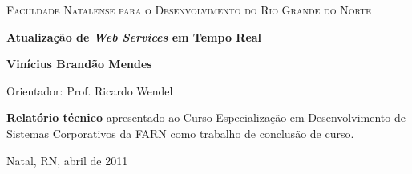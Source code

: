 %
%

\begin{titlepage}

\begin{center}

\small

\begin{center}
\textsf{\textsc{Faculdade Natalense para o Desenvolvimento do Rio Grande do Norte}}
\end{center} %

\vfill

\LARGE

\textbf{Atualização de \textit{Web Services} em Tempo Real}

\vfill

\Large

\textbf{Vinícius Brandão Mendes}

\vfill

\normalsize

Orientador: Prof. Ricardo Wendel

\vfill

\hfill
\parbox{0.5\linewidth}{\textbf{%
Relatório técnico}
apresentado ao Curso Especialização em Desenvolvimento
de Sistemas Corporativos da FARN
como trabalho de conclusão de curso.}

\vfill

\large


Natal, RN, abril de 2011

\end{center}

\end{titlepage}
